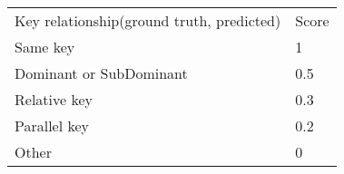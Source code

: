 \begin{tabular}{ll}
Key relationship(ground truth, predicted) & Score \\
Same key                                  & 1     \\
Dominant or SubDominant                   & 0.5   \\
Relative key                              & 0.3   \\
Parallel key                              & 0.2   \\
Other                                     & 0    
\end{tabular}
